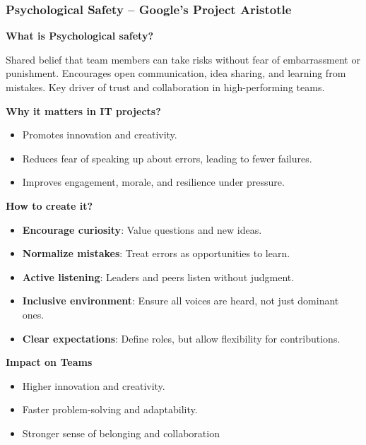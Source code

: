 \subsubsection{Psychological Safety – Google’s Project Aristotle}

\indent 

\noindent\textbf{What is Psychological safety?}

Shared belief that team members can take risks without fear of embarrassment 
or punishment. Encourages open communication, idea sharing, and learning from mistakes. Key driver of trust and collaboration in high-performing teams.

\bigskip

\noindent\textbf{Why it matters in IT projects?}

\begin{itemize}
    \item Promotes innovation and creativity.
    \item Reduces fear of speaking up about errors, leading to fewer failures.
    \item Improves engagement, morale, and resilience under pressure.
\end{itemize}

\bigskip

\noindent\textbf{How to create it?}

\begin{itemize}
    \item \textbf{Encourage curiosity}: Value questions and new ideas.
    \item \textbf{Normalize mistakes}: Treat errors as opportunities to learn.
    \item \textbf{Active listening}: Leaders and peers listen without judgment.
    \item \textbf{Inclusive environment}: Ensure all voices are heard, not just dominant ones.
    \item \textbf{Clear expectations}: Define roles, but allow flexibility for contributions.
\end{itemize}

\bigskip

\noindent\textbf{Impact on Teams}

\begin{itemize}
    \item Higher innovation and creativity.
    \item Faster problem-solving and adaptability.
    \item Stronger sense of belonging and collaboration
\end{itemize}

